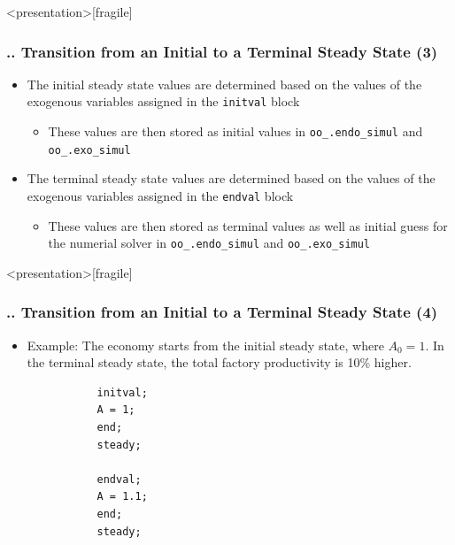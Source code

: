 \documentclass[11pt,aspectratio=169]{beamer}
\begin{document}
\begin{frame}<presentation>[fragile]
	\frametitle{{\thesection.\thesubsection.\thesubsubsection} Transition from an Initial to a Terminal Steady State (3)}
	\begin{itemize}
		\item The initial steady state values are determined based on the values of the exogenous variables assigned in the \texttt{initval} block 
		\begin{itemize}
			\item These values are then stored as initial values in \texttt{oo\_.endo\_simul} and \texttt{oo\_.exo\_simul}
		\end{itemize}
		\item The terminal steady state values are determined based on the values of the exogenous variables assigned in the \texttt{endval} block 
		\begin{itemize}
			\item These values are then stored as terminal values as well as initial guess for the numerial solver in \texttt{oo\_.endo\_simul} and \texttt{oo\_.exo\_simul}
		\end{itemize}
	\end{itemize}
\end{frame}
\begin{frame}<presentation>[fragile]
	\frametitle{{\thesection.\thesubsection.\thesubsubsection} Transition from an Initial to a Terminal Steady State (4)}
	\begin{itemize}
		\item Example: The economy starts from the initial steady state, where $A_0=1$. In the terminal steady state, the total factory productivity is 10\% higher.
		\begin{verbatim}
		   initval;
		   A = 1;
		   end; 
		   steady;
		
		   endval;
		   A = 1.1;
		   end;
		   steady;
		\end{verbatim}
	\end{itemize}
\end{frame}
\end{document}
